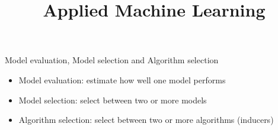 \documentclass[11pt,compress,t,notes=noshow, aspectratio=169, xcolor=table]{beamer}
\title{Applied Machine Learning}
\date{}
\begin{document}
\newcommand{\titlefigure}{figure/normal_densities}
\newcommand{\learninggoals}{
\item What questions can we answer with benchmarks?
\item What value do hypothesis tests add?
\item Benchmarking scenarios and relevant tests}


\begin{frame}{Model evaluation, Model selection and Algorithm selection}
\vfill
\begin{itemize}
    \item Model evaluation: estimate how well one model performs
    \item Model selection: select between two or more models
    \item Algorithm selection: select between two or more algorithms (inducers)
\end{itemize}
\vfill
\end{frame}


\end{document}
